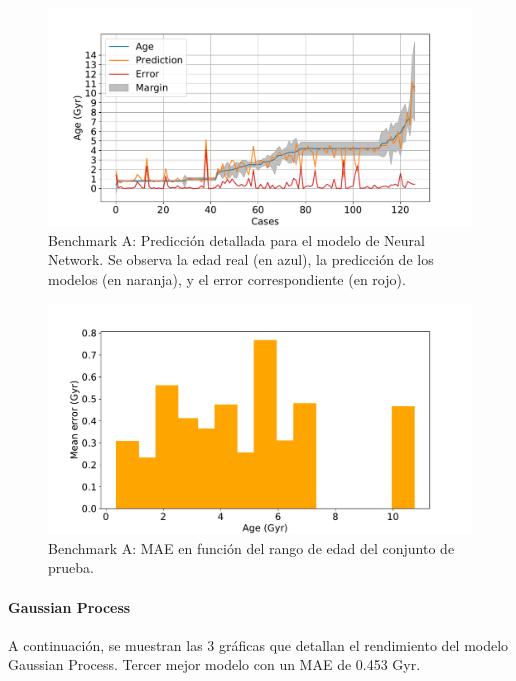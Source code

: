 \begin{figure}[H]
\begin{center}
 \includegraphics[width=0.8\linewidth]{Figuras/Experimentos/B_A_nnet_2.pdf}
\end{center}
\caption{Benchmark A: Predicción detallada para el modelo de Neural Network. Se observa la edad real (en azul), la predicción de los modelos (en naranja), y el error correspondiente (en rojo).}
 \label{fig:benchA_details_nnet_2}
\end{figure}

\begin{figure}[H]
\begin{center}
 \includegraphics[width=0.8\linewidth]{Figuras/Experimentos/B_A_nnet_3.pdf}
\end{center}
\caption{Benchmark A: MAE en función del rango de edad del conjunto de prueba.}
 \label{fig:benchA_details_nnet_3}
\end{figure}

\paragraph{Gaussian Process} 
A continuación, se muestran las 3 gráficas que detallan el rendimiento del modelo Gaussian Process. Tercer mejor modelo con un MAE de 0.453 Gyr.

